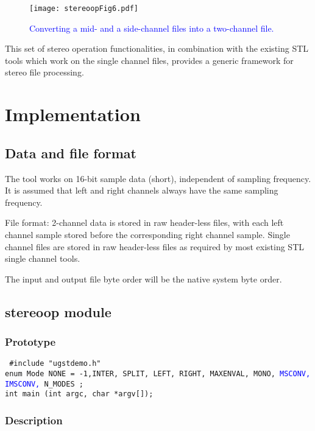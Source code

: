 \begin{figure}[htp]
    \begin{center}
        \texttt{[image: stereoopFig6.pdf]}
  \end{center}
  \caption{\textcolor{blue}{%
      Converting a mid- and a side-channel files into a two-channel file.}
           \label{fig:stereoopFig6} }
\end{figure}

This set of stereo operation functionalities, in combination with the
existing STL tools which work on the single channel files, provides a
generic framework for stereo file processing.

\section{Implementation}

\subsection{Data and file format}
The tool works on 16-bit sample data (short), independent of sampling
frequency. It is assumed that left and right channels always have the
same sampling frequency.

File format: 2-channel data is stored in raw header-less files, with
each left channel sample stored before the corresponding right channel
sample. Single channel files are stored in raw header-less files as
required by most existing STL single channel tools.

The input and output file byte order will be the native system byte
order.

\subsection{stereoop module}

\subsubsection{Prototype}

{\tt {\small
\#include "ugstdemo.h"\\
enum Mode{ NONE = -1,INTER, SPLIT, LEFT, RIGHT, MAXENVAL, MONO,
\textcolor{blue}{MSCONV, IMSCONV,} N\_MODES };\\
int main (int argc, char *argv[]);
}}

\subsubsection{Description}

